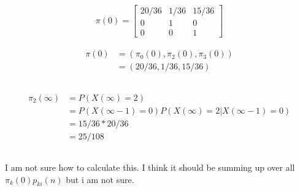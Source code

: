 \documentclass[12pt, a4paper]{article}
\begin{document}
\begin{align*}
  \pi(0) = \begin{bmatrix}
    20/36 & 1/36 & 15/36\\
    0 & 1 & 0\\
    0 & 0 & 1
  \end{bmatrix}
\end{align*}

\begin{subequations}
  \begin{align}
    \pi(0) &= (\pi_0(0), \pi_2(0), \pi_3(0))\\
           &= (20/36, 1/36, 15/36)
  \end{align}
\end{subequations}

\subsection{}
\begin{subequations}
  \begin{align}
    \pi_2(\infty) &= P(X(\infty)=2)\\
                  &= P(X(\infty-1)=0)P(X(\infty)=2|X(\infty-1)=0)\\
                  &= 15/36*20/36\\
                  &= 25/108
  \end{align}
\end{subequations}

\subsection{}
I am not sure how to calculate this. I think it should be summing up over all $\pi_k(0)p_{ki}(n)$ but i am not sure.
\end{document}
